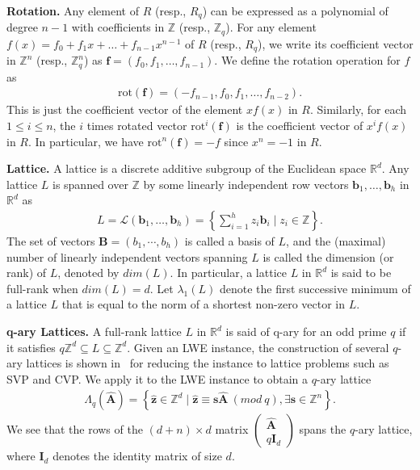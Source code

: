 \documentclass[12pt,a4paper]{article}
\numberwithin{equation}{section}
\begin{document}
\textbf{Rotation.} Any element of $R$ (resp., $R_q$) can be expressed as a polynomial of degree $n - 1$ with coefficients in $\mathbb{Z}$ (resp., $\mathbb{Z}_q$). For any element $f(x) = f_0 + f_1x + \ldots + f_{n-1}x^{n-1}$ of $R$ (resp., $R_q$), we write its coefficient vector in $\mathbb{Z}^n$ (resp., $\mathbb{Z}^n_q$) as $\mathbf{f} = (f_0, f_1, \ldots , f_{n-1})$. We define the rotation operation for $f$ as  
\begin{align}
    \mathrm{rot}(\mathbf{f}) = (-f_{n-1}, f_0, f_1, \ldots , f_{n-2}).
\end{align}
This is just the coefficient vector of the element $xf (x)$ in $R$. Similarly, for each $1 \leq i \leq  n$, the $i$ times rotated vector $\mathrm{rot}^i(\mathbf{f})$ is the coefficient vector of $x^if(x)$ in $R$. 
In particular, we have $\mathrm{rot}^n(\mathbf{f}) = -f$ since $x^n = -1$ in $R$.




\textbf{Lattice.}
A lattice is a discrete additive subgroup of the Euclidean space $\mathbb{R}^d$.
Any lattice $L$ is spanned over $\mathbb{Z}$ by some linearly independent row vectors $\mathbf{b}_1,\ldots, \mathbf{b}_h$ in $\mathbb{R}^d$ as 
\begin{align}
    L = \mathcal{L}(\mathbf{b}_1,\ldots, \mathbf{b}_h) = \left\{ \sum_{i=1}^h z_i \mathbf{b}_i \mid z_i \in \mathbb{Z} \right\}.
\end{align}
The set of vectors $\mathbf{B}=(b_1,\cdots, b_h)$ is called a basis of $L$, and the (maximal) number of linearly independent vectors spanning $L$ is called the dimension (or rank) of $L$, denoted by $dim(L)$.
In particular, a lattice $L$ in $\mathbb{R}^d$ is said to be full-rank when $dim(L) = d$.
Let $\lambda_1(L)$ denote the first successive minimum of a lattice $L$ that is equal to the norm of a shortest non-zero vector in $L$.

\textbf{q-ary Lattices.}
A full-rank lattice $L$ in $\mathbb{R}^d$ is said of q-ary for an odd prime $q$ if it satisfies $q \mathbb{Z}^d \subseteq L \subseteq \mathbb{Z}^d$. 
Given an LWE instance, the construction of several $q$-ary lattices is shown in~\cite{micciancioLatticebasedCryptography2009} for reducing the instance to lattice problems such as SVP and CVP. We apply it to the LWE instance to obtain a $q$-ary lattice
\begin{align}
    \Lambda_q(\mathbf{\hat{A}}) = \left\{ \mathbf{\hat{z}} \in \mathbb{Z}^d \mid \mathbf{\hat{z}} \equiv \mathbf{s}\mathbf{\hat{A}} \ (mod \ q), \exists \mathbf{s} \in \mathbb{Z}^n \right\}.
\end{align}
We see that the rows of the $(d+n)\times d$ matrix $\left( \begin{matrix}
\mathbf{\hat{A}} \\q\mathbf{I}_d
\end{matrix}\right)$ spans the $q$-ary lattice, where $\mathbf{I}_d$ denotes the identity matrix of size $d$.
\end{document}
